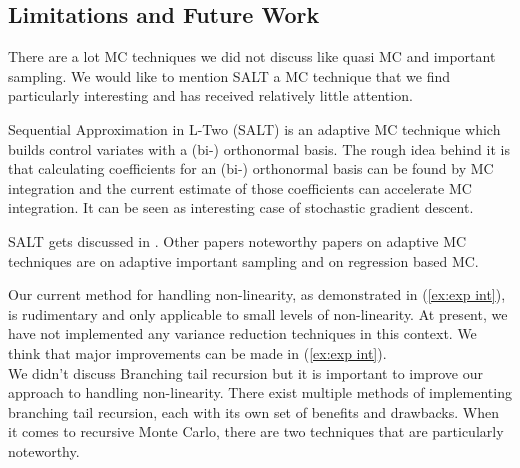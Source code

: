 \documentclass[a4paper,12pt]{article}
\begin{document}
\subsection{Limitations and Future Work}
There are a lot MC techniques we did not discuss like quasi MC and important sampling.
We would like to mention SALT  a MC technique that we find
particularly interesting and has received relatively little attention.

\begin{technique}[SALT]
    Sequential Approximation in L-Two (SALT) is an adaptive MC technique
    which builds control variates with a (bi-) orthonormal basis. The
    rough idea behind it is that calculating coefficients for
    an (bi-) orthonormal basis can be found by MC integration and
    the current estimate of those coefficients can accelerate MC integration.
    It can be seen as interesting case of stochastic gradient descent.
\end{technique}


\begin{related}[SALT]
    SALT gets discussed in \cite{gobet_new_nodate}. Other papers noteworthy papers on
    adaptive MC techniques are \cite{he_adaptive_2021} on adaptive important sampling
    and \cite{salaun_regression-based_2022} on regression based MC.
\end{related}


Our current method for handling non-linearity, as demonstrated
in (\ref{ex:exp int}), is rudimentary and only applicable to small
levels of non-linearity. At present, we have not implemented any
variance reduction techniques in this context. We think that
major improvements can be made in (\ref{ex:exp int}). \\


We didn't discuss Branching tail recursion but
it is important to improve our approach to handling non-linearity.
There exist multiple methods of implementing branching tail recursion,
each with its own set of benefits and drawbacks. When it comes to recursive
Monte Carlo, there are two techniques that are particularly noteworthy.
\end{document}
